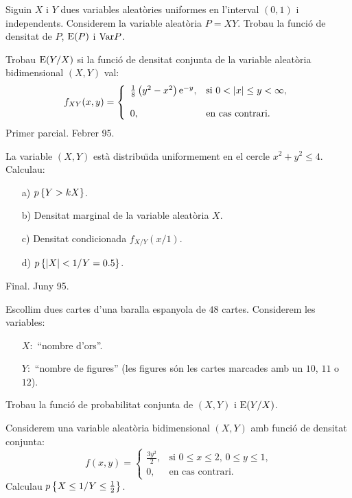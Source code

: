 \begin{prob}
{
Siguin $X$ i $Y$ dues variables aleat\`ories 
uniformes en l'interval $(0,1)$ i
independents. Considerem la variable aleat\`oria $P=XY$. 
Trobau la funci\'o de densitat de $P$, ${\rm E} (P)$ i
${\rm Var} P$.
}
\end{prob}

\begin{prob}
{
Trobau ${\rm E} (Y/X)$ si la funci\'o de densitat conjunta de 
la variable aleat\`oria bidimensional
$(X,Y)$ val:
\[
f_{XY} (x,y)=
\left\{
\begin{array}{ll}
\frac{1}{8} \left(y^2 -x^2\right) \e^{-y}, & \text{si $0<|x|\leq y<\infty$},
\\ & \\
0, & \text{en cas contrari.}
\end{array}
\right.
\]
{\footnotesize Primer parcial. Febrer 95.}
}
\end{prob}

\begin{prob}
{
La variable $(X,Y)$ est\`a distribu\"{\i}da uniformement en el cercle
$x^2+y^2\leq 4$. Calculau:
\begin{itemize}
\item[a)] $p\left\{Y>k X\right\}$.
\item[b)] Densitat marginal de la variable aleat\`oria $X$.
\item[c)] Densitat condicionada $f_{X/Y}(x/1)$. 
\item[d)] $p\left\{|X|<1/Y=0.5\right\}$.
\end{itemize}
{\footnotesize Final. Juny 95.}
}
\end{prob}

\begin{prob}
{
Escollim dues cartes d'una baralla espanyola de $48$ cartes. Considerem
les variables:
\begin{itemize}
\item[] $X:$ ``nombre d'ors''.
\item[] $Y:$ ``nombre de figures'' (les figures s\'on les cartes marcades amb
un $10$, $11$ o $12$).
\end{itemize}
Trobau la funci\'o de probabilitat conjunta de $(X,Y)$ i ${\rm E} (Y/X)$.
}
\end{prob}

\begin{prob}
{
Considerem una variable aleat\`oria bidimensional
 $(X,Y)$ amb funci\'o 
de densitat conjunta:
\[
f(x,y)=
\left\{ 
\begin{array}{ll}
\frac{3 y^2}{2}, & \text{si $0\leq x\leq 2$, $0\leq y\leq 1$,}\\
0, & \text{en cas contrari.}
\end{array}
\right.
\]
Calculau $p\left\{X\leq 1/Y\leq\frac{1}{2}\right\}$.
}
\end{prob}

